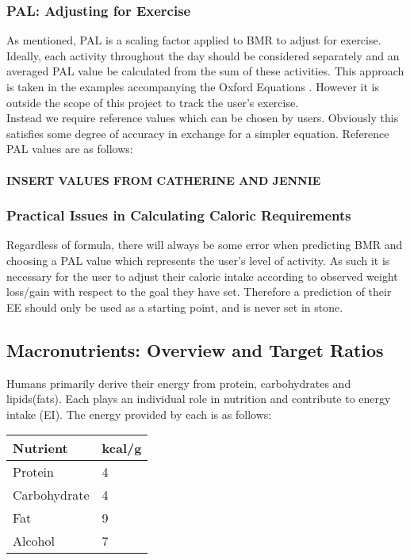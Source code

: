 \documentclass{article}
\begin{document}
\subsubsection{PAL: Adjusting for Exercise}
As mentioned, PAL is a scaling factor applied to BMR to adjust for exercise. Ideally, each activity throughout the day should be considered separately and an averaged PAL value be calculated from the sum of these activities. This approach is taken in the examples accompanying the Oxford Equations \cite[Tables.~23-28]{OxfordEquations}. However it is outside the scope of this project to track the user's exercise.\\
Instead we require reference values which can be chosen by users. Obviously this satisfies some degree of accuracy in exchange for a simpler equation. Reference PAL values are as follows:\\\\
\textbf{INSERT VALUES FROM CATHERINE AND JENNIE}

\subsubsection{Practical Issues in Calculating Caloric Requirements}
Regardless of formula, there will always be some error when predicting BMR and choosing a PAL value which represents the user's level of activity. As such it is necessary for the user to adjust their caloric intake according to observed weight loss/gain with respect to the goal they have set. Therefore a prediction of their EE should only be used as a starting point, and is never set in stone.



\subsection{Macronutrients: Overview and Target Ratios}
Humans primarily derive their energy from protein, carbohydrates and lipids(fats). Each plays an individual role in nutrition and contribute to energy intake (EI). The energy provided by each is as follows:

\begin{center}              %
\begin{tabular}{|l|l|}
\hline
	Nutrient & kcal/g \\ 
	\hline
	\hline
	Protein & 4 \\
	Carbohydrate & 4 \\
	Fat & 9 \\
	Alcohol & 7 \\
\hline
\end{tabular}
\end{center}
\end{document}

